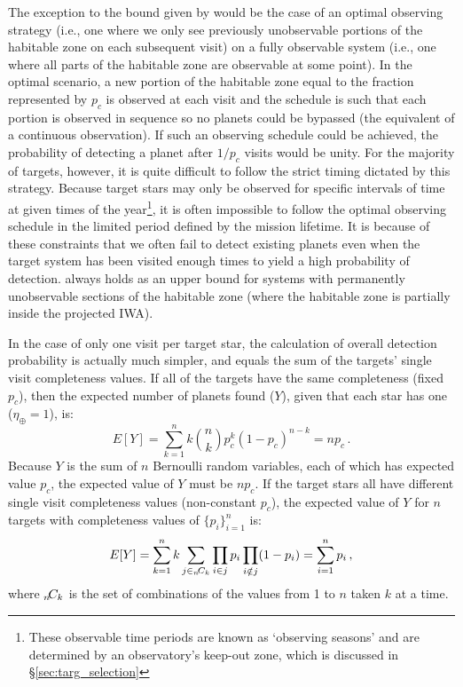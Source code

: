 The exception to the bound given by  would be the case of an optimal observing strategy (i.e., one where we only see previously unobservable portions of the habitable zone on each subsequent visit) on a fully observable system (i.e., one where all parts of the habitable zone are observable at some point).  In the optimal scenario, a new portion of the habitable zone equal to the fraction represented by $p_c$ is observed at each visit and the schedule is such that each portion is observed in sequence so no planets could be bypassed (the equivalent of a continuous observation).  If such an observing schedule could be achieved, the probability of detecting a planet after $1/p_c$ visits would be unity.  For the majority of targets, however, it is quite difficult to follow the strict timing dictated by this strategy.  Because target stars may only be observed for specific intervals of time at given times of the year\footnote{These observable time periods are known as `observing seasons' and are determined by an observatory's keep-out zone, which is discussed in \S\ref{sec:targ_selection}}, it is often impossible to follow the optimal observing schedule in the limited period defined by the mission lifetime.  It is because of these constraints that we often fail to detect existing planets even when the target system has been visited enough times to yield a high probability of detection.   always holds as an upper bound for systems with permanently unobservable sections of the habitable zone (where the habitable zone is partially inside the projected IWA).

In the case of only one visit per target star, the calculation of overall detection probability is actually much simpler, and equals the sum of the targets' single visit completeness values.  If all of the targets have the same completeness (fixed $p_c$), then the expected number of planets found ($Y$), given that each star has one ($\eta_\oplus = 1$), is:
\begin{equation}
E[Y] = \sum_{k = 1}^n k \binom{n}{k}  p_c^k (1-p_c)^{n-k} = np_c \,.
\end{equation}
Because $Y$ is the sum of $n$ Bernoulli random variables, each of which has expected value $p_c$, the expected value of $Y$ must be $np_c$.  If the target stars all have different single visit completeness values (non-constant $p_c$), the expected value of $Y$ for $n$ targets with completeness values of $\{p_i\}_{i=1}^n$ is:
\begin{equation}
E[Y] = \sum_{k = 1}^n k  \sum_{j \in \leftsub{n}{C}_k} \prod_{i \in j} p_i  \prod_{i \notin j} (1 - p_i) = \sum_{i = 1}^n{p_i}  \,,
\end{equation}
where $ \leftsub{n}{C}_k$ is the set of combinations of the values from 1 to $n$ taken $k$ at a time.

